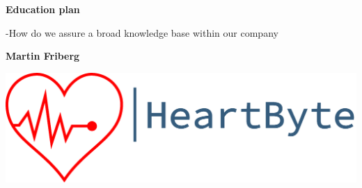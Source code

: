 \begin{titlepage}
   \begin{center}
       \vspace*{1cm}
        \Huge
       \textbf{Education plan}
        
        \Large
       \vspace{0.5cm}
        -How do we assure a broad knowledge base within our company
            
       \vspace{1.5cm}

       \textbf{Martin Friberg}

       \vfill
            
     
     \date{September 2020}

            
      \vfill
\includegraphics[width=\linewidth]{Pictures/logo_heartbyte_transparent_v_1_1 (1)}

    \vfill
            
   \end{center}
\end{titlepage}